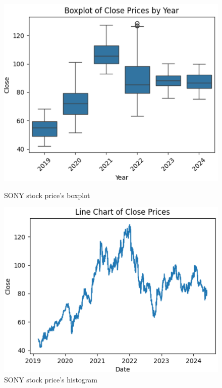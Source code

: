 \documentclass[conference]{IEEEtran}
\begin{document}
\begin{figure}[H]
    \centering
    \begin{minipage}{0.23\textwidth}
    \centering
    \includegraphics[width=1\textwidth]{Image/DatasetImg/SONY_Boxplot.png}
    \caption{SONY stock price's boxplot}
    \label{fig:1}
    \end{minipage}
    \hfill
    \begin{minipage}{0.23\textwidth}
    \centering
    \includegraphics[width=1\textwidth]{Image/DatasetImg/SONY_Line_chart.png}
    \caption{SONY stock price's histogram}
    \label{fig:2}
    \end{minipage}
\end{figure}
\end{document}
